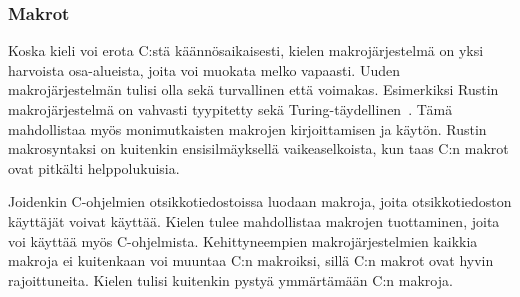%
%
%
%
%

\subsubsection{Makrot}

Koska kieli voi erota C:stä käännösaikaisesti, kielen makrojärjestelmä on yksi
harvoista osa-alueista, joita voi muokata melko vapaasti. Uuden
makrojärjestelmän tulisi olla sekä turvallinen että voimakas. Esimerkiksi
Rustin makrojärjestelmä on vahvasti tyypitetty sekä
Turing-täydellinen~\citep{rustmacros}. Tämä mahdollistaa myös monimutkaisten
makrojen kirjoittamisen ja käytön. Rustin makrosyntaksi on kuitenkin
ensisilmäyksellä vaikeaselkoista, kun taas C:n makrot ovat pitkälti
helppolukuisia.

Joidenkin C-ohjelmien otsikkotiedostoissa luodaan makroja, joita
otsikkotiedoston käyttäjät voivat käyttää. Kielen tulee mahdollistaa makrojen
tuottaminen, joita voi käyttää myös C-ohjelmista. Kehittyneempien
makrojärjestelmien kaikkia makroja ei kuitenkaan voi muuntaa C:n makroiksi,
sillä C:n makrot ovat hyvin rajoittuneita. Kielen tulisi kuitenkin pystyä
ymmärtämään C:n makroja.

